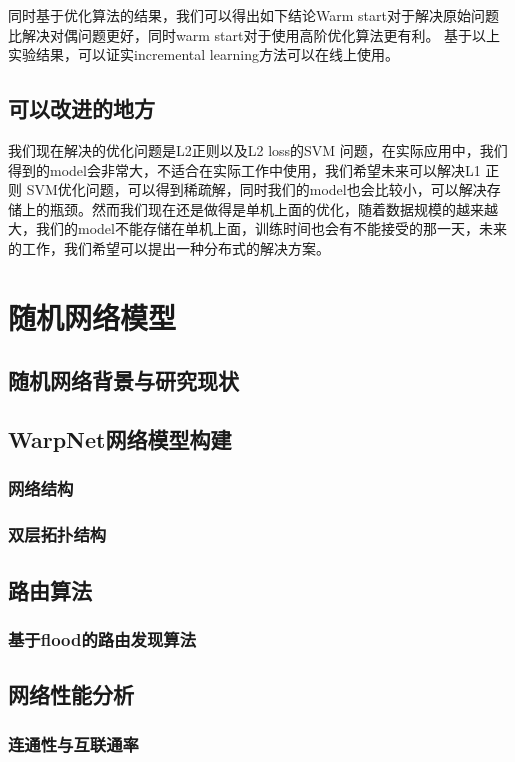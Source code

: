 \documentclass[master]{njuthesis}
\begin{document}
同时基于优化算法的结果，我们可以得出如下结论Warm start对于解决原始问题比解决对偶问题更好，同时warm start对于使用高阶优化算法更有利。
基于以上实验结果，可以证实incremental learning方法可以在线上使用。

\section{可以改进的地方}
我们现在解决的优化问题是L2正则以及L2 loss的SVM 问题，在实际应用中，我们得到的model会非常大，不适合在实际工作中使用，我们希望未来可以解决L1 正则 SVM优化问题，可以得到稀疏解，同时我们的model也会比较小，可以解决存储上的瓶颈。然而我们现在还是做得是单机上面的优化，随着数据规模的越来越大，我们的model不能存储在单机上面，训练时间也会有不能接受的那一天，未来的工作，我们希望可以提出一种分布式的解决方案。
\chapter{随机网络模型}\label{chapter_random}
\section{随机网络背景与研究现状}
\Blindtext
\section{WarpNet网络模型构建}\label{sec:warpnet_construction}
\subsection{网络结构}
\Blindtext
\subsection{双层拓扑结构}
\Blindtext
\section{路由算法}
\subsection{基于flood的路由发现算法}
\Blindtext
\section{网络性能分析}
\blindtext
\subsection{连通性与互联通率}
\Blindtext
\end{document}
